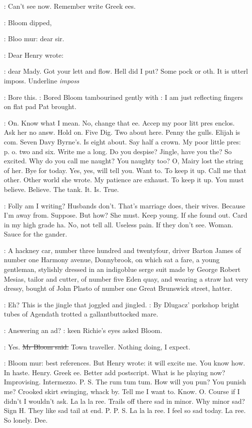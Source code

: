 \BloomInt:
Can't see now.
Remember write Greek ees.

:
Bloom dipped,

\BloomInt:
Bloo mur:
dear sir.

:
Dear Henry wrote:

\BloomInt:
dear Mady.
Got your lett and flow.
Hell did I put?
Some pock or oth.
It is utterl imposs.
Underline \emph{imposs}

\BloomInt:
Bore this.
:
Bored Bloom tambourined gently with
\BloomInt:
I am just reflecting
fingers on flat pad Pat brought.

\BloomInt:
On. Know what I mean. No, change that ee. Accep my poor litt pres
enclos. Ask her no answ. Hold on. Five Dig. Two about here. Penny the
gulls. Elijah is com. Seven Davy Byrne's. Is eight about. Say half a
crown. My poor little pres: p. o. two and six. Write me a long. Do you
despise? Jingle, have you the? So excited. Why do you call me naught?
You naughty too?
O, Mairy lost the string of her. Bye for today. Yes, yes,
will tell you. Want to. To keep it up. Call me that other. Other world she
wrote. My patience are exhaust. To keep it up. You must believe. Believe.
The tank. It. Is. True.

\BloomInt:
Folly am I writing? Husbands don't. That's marriage does, their
wives. Because I'm away from. Suppose. But how? She must. Keep young.
If she found out. Card in my high grade ha. No, not tell all. Useless
pain. If they don't see. Woman. Sauce for the gander.

:
A hackney car, number three hundred and twentyfour, driver Barton James of
number one Harmony avenue, Donnybrook, on which sat a fare,
a young gentleman,
stylishly dressed in an indigoblue serge suit made by
George Robert Mesias, tailor and cutter, of number five Eden quay, and
wearing a straw hat very dressy, bought of John Plasto of number one
Great Brunswick street, hatter.

\BloomInt:
Eh? This is the jingle that joggled and jingled.
:
By Dlugacz' porkshop bright tubes of Agendath trotted a
gallantbuttocked mare.

\goulding:
Answering an ad?
:
keen Richie's eyes asked Bloom.

\Bloom:
Yes.
\sout{Mr Bloom said.}
Town traveller. Nothing doing, I expect.

\BloomInt:
Bloom mur: best references. But Henry wrote: it will excite me. You
know how. In haste. Henry. Greek ee. Better add postscript. What is he
playing now? Improvising.
Intermezzo. P. S. The rum tum tum. How will
you pun? You punish me? Crooked skirt swinging, whack by. Tell me I want
to. Know. O. Course if I didn't I wouldn't ask. La la la ree. Trails off
there sad in minor. Why minor sad? Sign H. They like sad tail at end.
P. P. S. La la la ree. I feel so sad today. La ree. So lonely. Dee.

